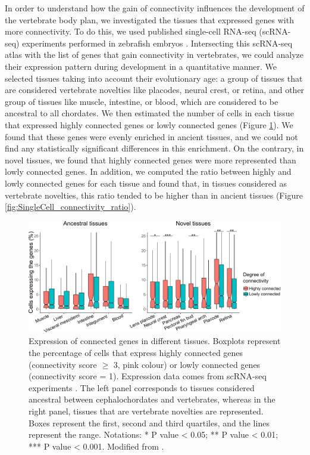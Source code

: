 In order to understand how the gain of connectivity influences the development of the vertebrate body plan, we investigated the tissues that expressed genes with more connectivity. To do this, we used published single-cell RNA-seq (scRNA-seq) experiments performed in zebrafish embryos \parencite{farnsworth_single-cell_2020}. Intersecting this scRNA-seq atlas with the list of genes that gain connectivity in vertebrates, we could analyze their expression pattern during development in a quantitative manner. We selected tissues taking into account their evolutionary age: a group of tissues that are considered vertebrate novelties like placodes, neural crest, or retina, and other group of tissues like muscle, intestine, or blood, which are considered to be ancestral to all chordates. We then estimated the number of cells in each tissue that expressed highly connected genes or lowly connected genes (Figure \ref{fig:SingleCell_connectivity}).  We found that these genes were evenly enriched in ancient tissues, and we could not find any statistically significant differences in this enrichment. On the contrary, in novel tissues, we found that highly connected genes were more represented than lowly connected genes. In addition, we computed the ratio between highly and lowly connected genes for each tissue and found that, in tissues considered as vertebrate novelties, this ratio tended to be higher than in ancient tissues (Figure \ref{fig:SingleCell_connectivity_ratio}).



\begin{figure}[h]
\centering
\includegraphics[width=1\textwidth]{Figures/SingleCell_connectivity}
\caption[Single-cell RNA-seq connectivity enrichment ]{Expression of connected genes in different tissues. Boxplots represent the percentage of cells that express highly connected genes (connectivity score $\geq $ 3, pink colour) or lowly connected genes (connectivity score = 1). Expression data comes from scRNA-seq experiments \parencite{farnsworth_single-cell_2020}. The left panel corresponds to tissues considered ancestral between cephalochordates and vertebrates, whereas in the right panel, tissues that are vertebrate novelties are represented. Boxes represent the first, second and third quartiles, and the lines represent the range.  Notations: * P value < 0.05; ** P value < 0.01; *** P value < 0.001. Modified from \parencite{gil-galvez_gain_2022}.}
\label{fig:SingleCell_connectivity}
\end{figure} 




